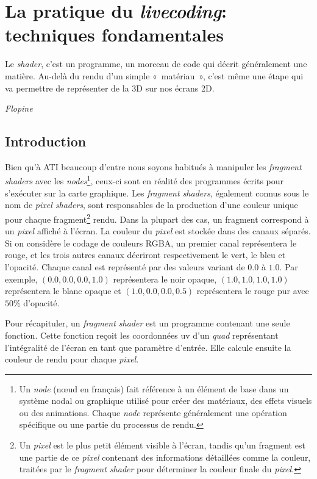 \chapter{La pratique du \textit{livecoding}: techniques fondamentales}
\setlength{\epigraphwidth}{0.4\linewidth} %
\epigraph{Le \textit{shader}, c’est un programme, un morceau de code qui décrit généralement une matière. Au-delà du rendu d’un simple «~matériau~», c’est même une étape qui va permettre de représenter de la 3D sur nos écrans 2D.}{\textit{Flopine}}


\section{Introduction}

Bien qu'à ATI beaucoup d'entre nous soyons habitués à manipuler les \textit{fragment shaders} avec les \textit{nodes}\footnote{Un \textit{node} (nœud en français) fait référence à un élément de base dans un système nodal ou graphique utilisé pour créer des matériaux, des effets visuels ou des animations. Chaque \textit{node} représente généralement une opération spécifique ou une partie du processus de rendu. }, ceux-ci sont en réalité des programmes écrits pour s'exécuter sur la carte graphique. Les \textit{fragment shaders}, également connus sous le nom de \textit{pixel shaders}, sont responsables de la production d'une couleur unique pour chaque fragment\footnote{Un \textit{pixel} est le plus petit élément visible à l'écran, tandis qu'un fragment est une partie de ce \textit{pixel} contenant des informations détaillées comme la couleur, traitées par le \textit{fragment shader} pour déterminer la couleur finale du \textit{pixel}.} rendu. Dans la plupart des cas, un fragment correspond à un \textit{pixel} affiché à l'écran. La couleur du \textit{pixel} est stockée dans des canaux séparés. Si on considère le codage de couleurs RGBA, un premier canal représentera le rouge, et les trois autres canaux décriront respectivement le vert, le bleu et l'opacité. Chaque canal est représenté par des valeurs variant de $0.0$ à $1.0$. Par exemple,  $(0.0, 0.0, 0.0, 1.0)$ représentera le noir opaque, $(1.0, 1.0, 1.0, 1.0)$ représentera le blanc opaque et $(1.0, 0.0, 0.0, 0.5)$ représentera le rouge pur avec $50\%$ d'opacité.

Pour récapituler, un \textit{fragment shader} est un programme contenant une seule fonction. Cette fonction reçoit les coordonnées uv d'un \textit{quad} représentant l'intégralité de l'écran en tant que paramètre d'entrée. Elle calcule ensuite la couleur de rendu pour chaque \textit{pixel}.

